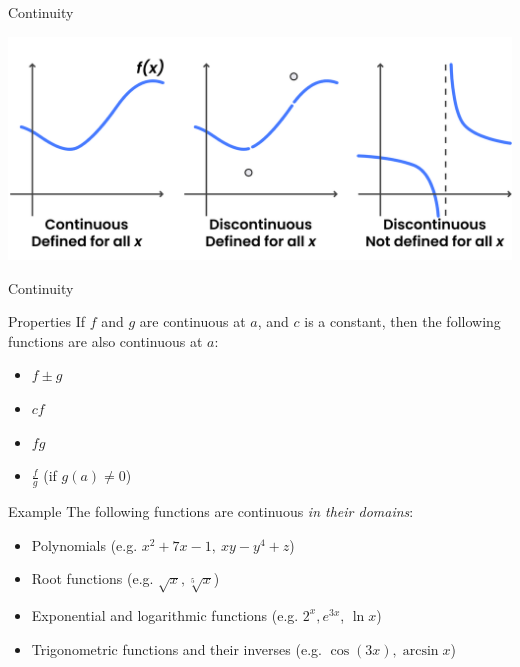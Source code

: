 \documentclass{beamer}
\begin{document}
\begin{frame}{Continuity}
      \begin{center}

    \includegraphics[width=\textwidth, height=\textheight, keepaspectratio]{cont.png}
  \end{center}
\end{frame}


\begin{frame}{Continuity}
   \begin{block}{Properties}
       If \(f\) and \(g\) are continuous at \(a\), and \(c\) is a constant, then the following functions are also continuous at \(a\):

\begin{itemize}
    \item \(f \pm g\)
    \item \(cf\)
    \item \(fg\)
    \item \(\frac{f}{g}\) (if \(g(a) \neq 0\))
\end{itemize}
   \end{block}
   \pause
   \begin{exampleblock}{Example}
   The following functions are continuous \textit{in their domains}: 
     \begin{itemize}
         \item Polynomials (e.g. $x^2+7x-1, \: xy-y^4+z$)
         \item Root functions (e.g. $\sqrt{x}, \sqrt[5]{x}$)
         \item Exponential and logarithmic functions (e.g. $2^x, e^{3x}$, $\ln{x}$)
         \item Trigonometric functions and their inverses (e.g. $\cos(3x), \arcsin{x}$)
     \end{itemize}
   \end{exampleblock}
\end{frame}
\end{document}
